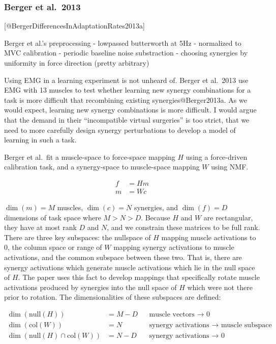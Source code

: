 \documentclass[../main.tex]{subfiles}
\begin{document}
{{{{{{{{{{{\subsubsection{Berger et al.~2013}\label{berger-et-al.-2013}

{[}@BergerDifferencesInAdaptationRates2013a{]}

Berger et al.'s preprocessing - lowpassed butterworth at 5Hz -
normalized to MVC calibration - periodic baseline noise substraction -
choosing synergies by uniformity in force direction (pretty arbitrary)

Using EMG in a learning experiment is not unheard of. Berger et al.~2013
use EMG with 13 muscles to test whether learning new synergy
combinations for a task is more difficult that recombining existing
synergies@Berger2013a. As we would expect, learning new synergy
combinations is more difficult. I would argue that the demand in their
``incompatible virtual surgeries'' is too strict, that we need to more
carefully design synergy perturbations to develop a model of learning in
such a task.

Berger et al.~fit a muscle-space to force-space mapping \(H\) using a
force-driven calibration task, and a synergy-space to muscle-space
mapping \(W\) using NMF.

\begin{align*}
    f &= Hm \\
    m &= Wc
\end{align*}

\(\dim(m)=M\) muscles, \(\dim(c)=N\) synergies, and \(\dim(f)=D\)
dimensions of task space where \(M>N>D\). Because \(H\) and \(W\) are
rectangular, they have at most rank \(D\) and \(N\), and we constrain
these matrices to be full rank. There are three key subspaces: the
nullspace of \(H\) mapping muscle activations to 0, the column space or
range of \(W\) mapping synergy activations to muscle activations, and
the common subspace between these two. That is, there are synergy
activations which generate muscle activations which lie in the null
space of \(H\). The paper uses this fact to develop mappings that
specifically rotate muscle activations produced by synergies into the
null space of \(H\) which were not there prior to rotation. The
dimensionalities of these subspaces are defined:

\begin{align*}
\dim(\mathrm{null}(H)) &= M - D && \text{muscle vectors $\rightarrow$ 0} \\
\dim(\mathrm{col}(W)) &= N && \text{synergy activations $\rightarrow$ muscle subspace}\\
\dim(\mathrm{null}(H)\cap\mathrm{col}(W)) &= N - D && \text{synergy activations $\rightarrow$ 0} \\
\end{align*}

}}}}}}}}}}}
\end{document}

